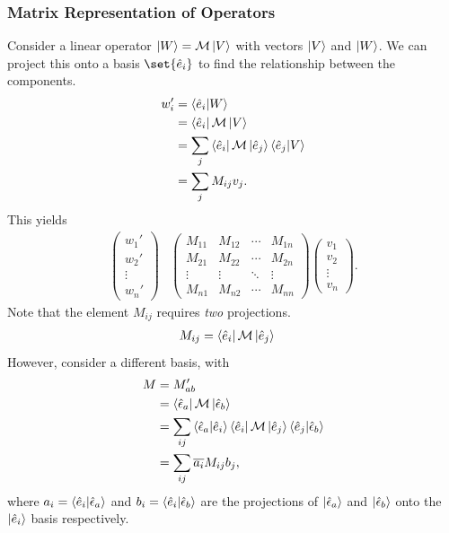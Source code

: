 \documentclass[10pt]{mypackage}
\begin{document}
\subsubsection{Matrix Representation of Operators}%
Consider a linear operator $\ket{W} = \mathcal{M}\ket{V}$ with vectors $\ket{V}$ and $\ket{W}$. We can project this onto a basis $\set{\hat{e}_i}$ to find the relationship between the components.
\begin{align*}
  w_i' &= \braket{\hat{e}_i}{W}\\
       &= \bra{\hat{e}_i}\mathcal{M}\ket{V}\\
       &= \sum_{j}\bra{\hat{e}_i}\mathcal{M}\ket{\hat{e}_j}\braket{\hat{e}_j}{V}\\
       &= \sum_{j} M_{ij}v_j.
\end{align*}
This yields
\begin{align*}
  \begin{pmatrix}w_1'\\w_2'\\\vdots\\w_n'\end{pmatrix} & \begin{pmatrix}M_{11} & M_{12} & \cdots & M_{1n}\\ M_{21} & M_{22} & \cdots & M_{2n} \\ \vdots & \vdots & \ddots & \vdots \\ M_{n1} & M_{n2} & \cdots & M_{nn}\end{pmatrix} \begin{pmatrix}v_1\\v_2\\\vdots\\v_n\end{pmatrix}.
\end{align*}
Note that the element $M_{ij}$ requires \textit{two} projections.
\begin{align*}
  M_{ij} &= \bra{\hat{e}_i}\mathcal{M}\ket{\hat{e}_j}
\end{align*}
However, consider a different basis, with
\begin{align*}
  M &= M_{ab}'\\
    &= \bra{\hat{\epsilon}_a}\mathcal{M}\ket{\hat{\epsilon}_b}\\
    &= \sum_{ij}\braket{\hat{\epsilon}_{a}}{\hat{e}_i}\bra{\hat{e}_i}\mathcal{M}\ket{\hat{e}_j}\braket{\hat{e}_j}{\hat{\epsilon}_b}\\
    &= \sum_{ij}\overline{a_i}M_{ij}b_j,
\end{align*}
where $a_i = \braket{\hat{e}_i}{\hat{\epsilon}_a}$ and $b_i = \braket{\hat{e}_i}{\hat{\epsilon}_b}$ are the projections of $\ket{\hat{\epsilon}_{a}}$ and $\ket{\hat{\epsilon}_b}$ onto the $\ket{\hat{e}_i}$ basis respectively.
\end{document}
